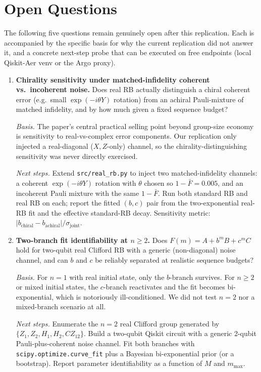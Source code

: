 \section{Open Questions}
\label{sec:open-questions}

The following five questions remain genuinely open after this replication.
Each is accompanied by the specific basis for why the current replication
did not answer it, and a concrete next-step probe that can be executed on
free endpoints (local Qiskit-Aer venv or the Argo proxy).

\begin{enumerate}

\item \textbf{Chirality sensitivity under matched-infidelity coherent
vs.\ incoherent noise.} Does real RB actually distinguish a chiral coherent
error (e.g.\ small $\exp(-i\theta Y)$ rotation) from an achiral Pauli-mixture
of matched infidelity, and by how much given a fixed sequence budget?

\emph{Basis.} The paper's central practical selling point beyond group-size
economy is sensitivity to real-vs-complex error components. Our replication
only injected a real-diagonal ($X, Z$-only) channel, so the
chirality-distinguishing sensitivity was never directly exercised.

\emph{Next steps.} Extend \texttt{src/real\_rb.py} to inject two
matched-infidelity channels: a coherent $\exp(-i\theta Y)$ rotation with
$\theta$ chosen so $1 - \bar F = 0.005$, and an incoherent Pauli mixture with
the same $1 - \bar F$. Run both standard RB and real RB on each; report the
fitted $(b, c)$ pair from the two-exponential real-RB fit and the effective
standard-RB decay. Sensitivity metric:
$|b_{\text{chiral}} - b_{\text{achiral}}| / \sigma_{\text{joint}}$.

\item \textbf{Two-branch fit identifiability at $n \geq 2$.} Does
$F(m) = A + b^m B + c^m C$ hold for two-qubit real Clifford RB with a generic
(non-diagonal) noise channel, and can $b$ and $c$ be reliably separated at
realistic sequence budgets?

\emph{Basis.} For $n = 1$ with real initial state, only the $b$-branch
survives. For $n \geq 2$ or mixed initial states, the $c$-branch reactivates
and the fit becomes bi-exponential, which is notoriously ill-conditioned.
We did not test $n = 2$ nor a mixed-branch scenario at all.

\emph{Next steps.} Enumerate the $n = 2$ real Clifford group generated by
$\{Z_1, Z_2, H_1, H_2, CZ_{12}\}$. Build a two-qubit Qiskit circuit with a
generic 2-qubit Pauli-plus-coherent noise channel. Fit both branches with
\texttt{scipy.optimize.curve\_fit} plus a Bayesian bi-exponential prior (or
a bootstrap). Report parameter identifiability as a function of $M$ and
$m_{\max}$.


\end{enumerate}
